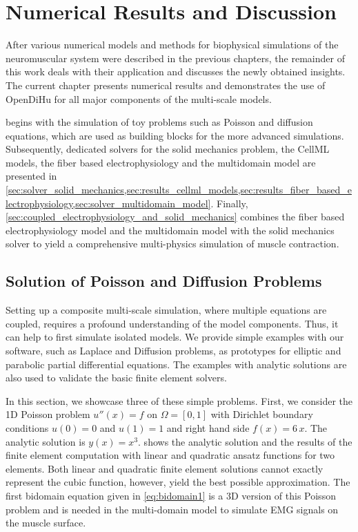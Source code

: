 \chapter{Numerical Results and Discussion}\label{sec:results}

After various numerical models and methods for biophysical simulations of the neuromuscular system were described in the previous chapters, the remainder of this work deals with their application and discusses the newly obtained insights.
The current chapter presents numerical results and demonstrates the use of OpenDiHu for all major components of the multi-scale models. 

 begins with the simulation of toy problems such as Poisson and diffusion equations, which are used as building blocks for the more advanced simulations. Subsequently, dedicated solvers for the solid mechanics problem, the CellML models, the fiber based electrophysiology and the multidomain model are presented in \cref{sec:solver_solid_mechanics,sec:results_cellml_models,sec:results_fiber_based_electrophysiology,sec:solver_multidomain_model}. Finally, \cref{sec:coupled_electrophysiology_and_solid_mechanics} combines the fiber based electrophysiology model and the multidomain model with the solid mechanics solver to yield a comprehensive multi-physics simulation of muscle contraction.

%

\section{Solution of Poisson and Diffusion Problems}\label{sec:poisson_diffusion}

Setting up a composite multi-scale simulation, where multiple equations are coupled, requires a profound understanding of the model components. 
Thus, it can help to first simulate isolated models. We provide simple examples with our software, such as Laplace and Diffusion problems, as prototypes for elliptic and parabolic partial differential equations. The examples with analytic solutions are also used to validate the basic finite element solvers.

In this section, we showcase three of these simple problems. First, we consider the 1D Poisson problem $u''(x) = f$ on $\Omega=[0,1]$ with Dirichlet boundary conditions $u(0)=0$ and $u(1)=1$ and right hand side $f(x)=6\,x$. The analytic solution is $y(x)=x^3$.  shows the analytic solution and the results of the finite element computation with linear and quadratic ansatz functions for two elements. Both linear and quadratic finite element solutions cannot exactly represent the cubic function, however, yield the best possible approximation. 
The first bidomain equation given in \cref{eq:bidomain1} is a 3D version of this Poisson problem and is needed in the multi-domain model to simulate EMG signals on the muscle surface.

